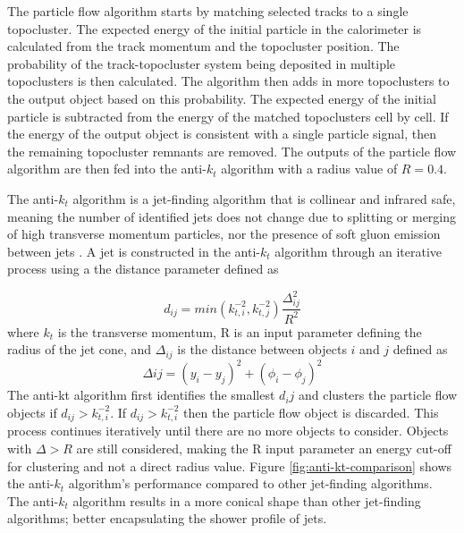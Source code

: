 		The particle flow algorithm starts by matching selected tracks to a single topocluster. The expected energy of the initial particle in the calorimeter is calculated from the track momentum and the topocluster position. The probability of the track-topocluster system being deposited in multiple topoclusters is then calculated. The algorithm then adds in more topoclusters to the output object based on this probability. The expected energy of the initial particle is subtracted from the energy of the matched topoclusters cell by cell. If the energy of the output object is consistent with a single particle signal, then the remaining topocluster remnants are removed. The outputs of the particle flow algorithm are then fed into the anti-$k_t$ algorithm \cite{anti-kt} with a radius value of $R=0.4$. 

		The anti-$k_t$ algorithm is a jet-finding algorithm that is collinear and infrared safe, meaning the number of identified jets does not change due to splitting or merging of high transverse momentum particles, nor the presence of soft gluon emission between jets \cite{Cacciari_2008}. A jet is constructed in the anti-$k_t$ algorithm through an iterative process using a the distance parameter defined as 

		\begin{equation}\label{eqn:anti-kt-distance}
		d_{ij} = min(k_{t,i}^{-2} , k_{t,j}^{-2}) \frac{\Delta_{ij}^{2}}{R^2} 
		\end{equation}
		where $k_t$ is the transverse momentum, R is an input parameter defining the radius of the jet cone, and $\Delta_{ij}$ is the distance between objects $i$ and $j$ defined as
		\begin{equation}\label{eqn:anti-kt-delta}
		\Delta{ij} = (y_i - y_j)^2 + (\phi_i - \phi_j)^2
		\end{equation}
		The anti-kt algorithm first identifies the smallest $d_ij$ and clusters the particle flow objects if $d_{ij}>k_{t,i}^{-2}$. If $d_{ij}>k_{t,i}^{-2}$ then the particle flow object is discarded. This process continues iteratively until there are no more objects to consider. Objects with $\Delta>R$ are still considered, making the R input parameter an energy cut-off for clustering and not a direct radius value. Figure \ref{fig:anti-kt-comparison} shows the anti-$k_{t}$ algorithm's performance compared to other jet-finding algorithms. The anti-$k_{t}$ algorithm results in a more conical shape than other jet-finding algorithms; better encapsulating the shower profile of jets.

